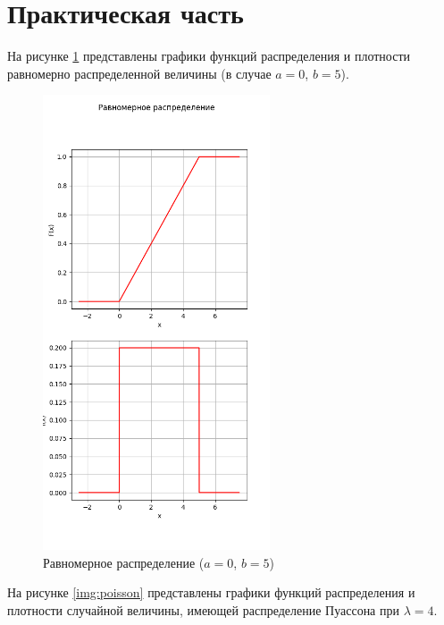 \section{Практическая часть}

На рисунке \ref{img:universal} представлены графики функций распределения и плотности равномерно распределенной величины (в случае $a = 0$, $b = 5$).

\begin{figure}[!htb]\centering
	\includegraphics[width=0.6\textwidth]{../img/universal.png}
	\caption{Равномерное распределение ($a = 0$, $b = 5$)}
	\label{img:universal}
\end{figure}

\clearpage

На рисунке \ref{img:poisson} представлены графики функций распределения и плотности случайной величины, имеющей распределение Пуассона при $\lambda = 4$.

